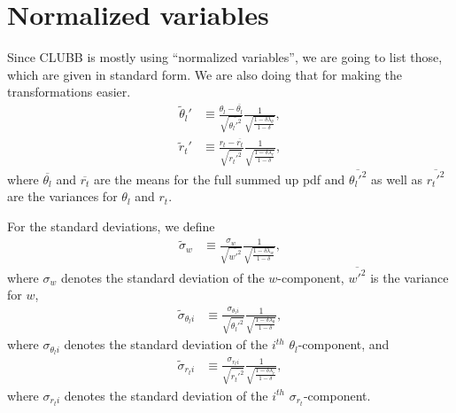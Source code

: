 \section{Normalized variables}\label{sec:normalized-variables}

Since \gls{CLUBB} is mostly using \enquote{normalized variables},
we are going to list those, which are given in standard form.
We are also doing that for making the transformations easier.
\begin{align}
    \label{eq:theta_l_prime_tilde}
    \tilde{\theta}_l'
    &\equiv \frac{\theta_l - \overline{\theta_l}}{\sqrt{\overline{\theta_l'^2}}}
    \frac{1}{\sqrt{\frac{1 - \delta \lambda_\theta}{1 - \delta}}},
\end{align}
\begin{align}
    \label{eq:r_t_prime_tilde}
    \tilde{r}_t'
    &\equiv \frac{r_t - \overline{r_t}}{\sqrt{\overline{r_t'^2}}}
    \frac{1}{\sqrt{\frac{1 - \delta \lambda_r}{1 - \delta}}},
\end{align}
where $\overline{\theta_l}$ and $\overline{r_t}$ are the means for the full summed up \gls{pdf}
and $\overline{\theta_l'^2}$ as well as $\overline{r_t'^2}$ are the variances for $\theta_l$ and $r_t$.

For the standard deviations, we define
\begin{align}
    \label{eq:sigma_w_tilde}
    \tilde{\sigma}_w
    &\equiv \frac{\sigma_w}{\sqrt{\overline{w'^2}}}
    \frac{1}{\sqrt{\frac{1-\delta\lambda_w}{1-\delta}}},
\end{align}
where $\sigma_w$ denotes the standard deviation of the $w$-component,
$\overline{w'^2}$ is the variance for $w$,
\begin{align}
    \label{eq:sigma_theta_l_i_tilde}
    \tilde{\sigma}_{\theta_l i}
    &\equiv \frac{\sigma_{\theta_l i}}{\sqrt{\overline{\theta_l'^2}}}
    \frac{1}{\sqrt{\frac{1-\delta\lambda_\theta}{1-\delta}}},
\end{align}
where $\sigma_{\theta_l i}$ denotes the standard deviation of the $i^{th}$ $\theta_l$-component,
and
\begin{align}
    \label{eq:sigma_r_t_i_tilde}
    \tilde{\sigma}_{r_t i}
    &\equiv \frac{\sigma_{r_t i}}{\sqrt{\overline{r_t'^2}}}
    \frac{1}{\sqrt{\frac{1-\delta\lambda_r}{1-\delta}}},
\end{align}
where $\sigma_{r_t i}$ denotes the standard deviation of the $i^{th}$ $\sigma_{r_t}$-component.